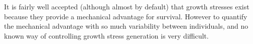 It is fairly well accepted (although almost by default) that growth stresses
exist because they provide a mechanical advantage for survival. However to
quantify the mechanical advantage with so much variability between individuals,
and no known way of controlling growth stress generation is very difficult.
